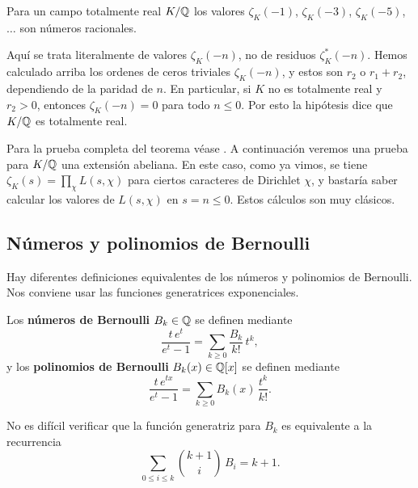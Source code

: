 \begin{teorema}
  Para un campo totalmente real $K/\mathbb{Q}$ los valores
  $\zeta_K (-1)$, $\zeta_K (-3)$, $\zeta_K (-5)$, $\ldots$
  son números racionales.
\end{teorema}

Aquí se trata literalmente de valores $\zeta_K (-n)$, no de residuos
$\zeta_K^* (-n)$. Hemos calculado arriba los ordenes de ceros triviales
$\zeta_K (-n)$, y estos son $r_2$ o $r_1 + r_2$, dependiendo de la paridad de
$n$. En particular, si $K$ no es totalmente real y $r_2 > 0$, entonces
$\zeta_K (-n) = 0$ para todo $n \le 0$. Por esto la hipótesis dice que $K/\mathbb{Q}$
es totalmente real.

Para la prueba completa del teorema véase \cite[\S VII.9]{Neukirch-ANT}.
A continuación veremos una prueba para $K/\mathbb{Q}$ una extensión abeliana. En este
caso, como ya vimos, se tiene $\zeta_K (s) = \prod_\chi L (s,\chi)$ para ciertos
caracteres de Dirichlet $\chi$, y bastaría saber calcular los valores de
$L (s,\chi)$ en $s = n \le 0$.  Estos cálculos son muy clásicos.

\subsection{Números y polinomios de Bernoulli}

Hay diferentes definiciones equivalentes de los números y polinomios de
Bernoulli. Nos conviene usar las funciones generatrices exponenciales.

\begin{definicion}
  Los \textbf{números de Bernoulli} $B_k \in \mathbb{Q}$ se definen mediante
  $$\frac{t\,e^t}{e^t - 1} = \sum_{k\ge 0} \frac{B_k}{k!}\,t^k,$$
  y los \textbf{polinomios de Bernoulli} $B_k (x) \in \mathbb{Q} [x]$ se definen
  mediante
  $$\frac{t\,e^{tx}}{e^t-1} = \sum_{k \ge 0} B_k (x)\,\frac{t^k}{k!}.$$
\end{definicion}

No es difícil verificar que la función generatriz para $B_k$ es equivalente a
la recurrencia
$$\sum_{0 \le i \le k} {k+1 \choose i}\,B_i = k+1.$$

